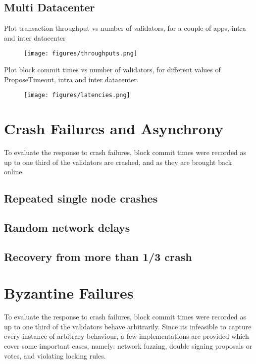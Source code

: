 \subsection{Multi Datacenter}

Plot transaction throughput vs number of validators, for a couple of apps, intra and inter datacenter

\begin{figure}[]
	\texttt{[image: figures/throughputs.png]}
    	\centering
	\label{fig:tx_throughput}
\end{figure}

Plot block commit times vs number of validators, for different values of ProposeTimeout, intra and inter datacenter.

\begin{figure}[]
	\texttt{[image: figures/latencies.png]}
    	\centering
	\label{fig:block_latencies}
\end{figure}

\section{Crash Failures and Asynchrony}

To evaluate the response to crash failures, 
block commit times were recorded as up to one third of the validators are crashed,
and as they are brought back online. 

\subsection{Repeated single node crashes}

\subsection{Random network delays}

\subsection{Recovery from more than 1/3 crash}


\section{Byzantine Failures}

To evaluate the response to crash failures, 
block commit times were recorded as up to one third of the validators behave arbitrarily.
Since its infeasible to capture every instance of arbitrary behaviour,
a few implementations are provided which cover some important cases, namely:
network fuzzing, double signing proposals or votes, and violating locking rules.

